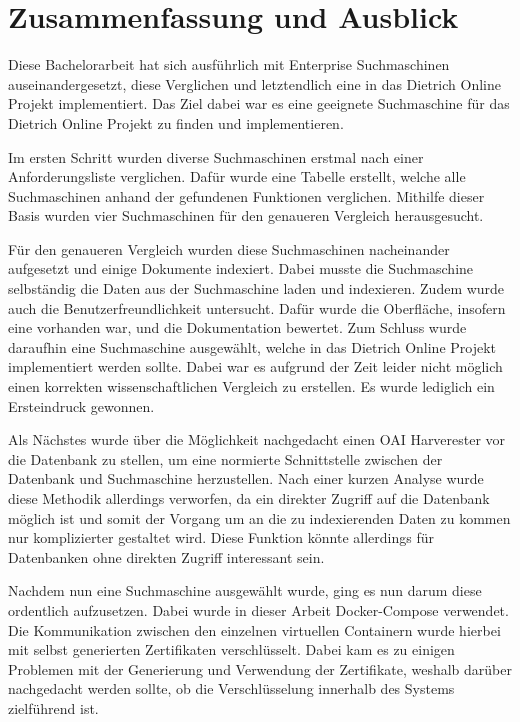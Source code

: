 \chapter{Zusammenfassung und Ausblick}

Diese Bachelorarbeit hat sich ausführlich mit Enterprise Suchmaschinen auseinandergesetzt, diese Verglichen und letztendlich eine in das Dietrich Online Projekt implementiert. Das Ziel dabei war es eine geeignete Suchmaschine für das Dietrich Online Projekt zu finden und implementieren.  

Im ersten Schritt wurden diverse Suchmaschinen erstmal nach einer Anforderungsliste verglichen. Dafür wurde eine Tabelle erstellt, welche alle Suchmaschinen anhand der gefundenen Funktionen verglichen. Mithilfe dieser Basis wurden vier Suchmaschinen für den genaueren Vergleich herausgesucht.

Für den genaueren Vergleich wurden diese Suchmaschinen nacheinander aufgesetzt und einige Dokumente indexiert. Dabei musste die Suchmaschine selbständig die Daten aus der Suchmaschine laden und indexieren. Zudem wurde auch die Benutzerfreundlichkeit untersucht. Dafür wurde die Oberfläche, insofern eine vorhanden war, und die Dokumentation bewertet. Zum Schluss wurde daraufhin eine Suchmaschine ausgewählt, welche in das Dietrich Online Projekt implementiert werden sollte. Dabei war es aufgrund der Zeit leider nicht möglich einen korrekten wissenschaftlichen Vergleich zu erstellen. Es wurde lediglich ein Ersteindruck gewonnen.

Als Nächstes wurde über die Möglichkeit nachgedacht einen OAI Harverester vor die Datenbank zu stellen, um eine normierte Schnittstelle zwischen der Datenbank und Suchmaschine herzustellen. Nach einer kurzen Analyse wurde diese Methodik allerdings verworfen, da ein direkter Zugriff auf die Datenbank möglich ist und somit der Vorgang um an die zu indexierenden Daten zu kommen nur komplizierter gestaltet wird. Diese Funktion könnte allerdings für Datenbanken ohne direkten Zugriff interessant sein. 

Nachdem nun eine Suchmaschine ausgewählt wurde, ging es nun darum diese ordentlich aufzusetzen. Dabei wurde in dieser Arbeit Docker-Compose verwendet. Die Kommunikation zwischen den einzelnen virtuellen Containern wurde hierbei mit selbst generierten Zertifikaten verschlüsselt. Dabei kam es zu einigen Problemen mit der Generierung und Verwendung der Zertifikate, weshalb darüber nachgedacht werden sollte, ob die Verschlüsselung innerhalb des Systems zielführend ist. 

